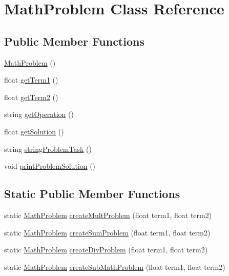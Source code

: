\hypertarget{classMathProblem}{}\section{Math\+Problem Class Reference}
\label{classMathProblem}
\subsection*{Public Member Functions}
\begin{DoxyCompactItemize}
\item 
\hyperlink{classMathProblem_ad2df5ab798f1d5565f92db064a4683c1}{Math\+Problem} ()
\item 
float \hyperlink{classMathProblem_a4b39e98b486c8ce8322344d1189037f6}{get\+Term1} ()
\item 
float \hyperlink{classMathProblem_a5ef6bc92617fc30f7e19202c68d368e6}{get\+Term2} ()
\item 
string \hyperlink{classMathProblem_aaee9edad612c513d35416f75808facc4}{get\+Operation} ()
\item 
float \hyperlink{classMathProblem_a52c59481043bb463a9d08e5e51814b94}{get\+Solution} ()
\item 
string \hyperlink{classMathProblem_a6d9253af58a404a4fc6ada40203059d1}{string\+Problem\+Task} ()
\item 
void \hyperlink{classMathProblem_a177a64e01b81e75a4d790f10693437a9}{print\+Problem\+Solution} ()
\end{DoxyCompactItemize}
\subsection*{Static Public Member Functions}
\begin{DoxyCompactItemize}
\item 
static \hyperlink{classMathProblem}{Math\+Problem} \hyperlink{classMathProblem_a63bcf12dc631ce2b79be84d49a395d6a}{create\+Mult\+Problem} (float term1, float term2)
\item 
static \hyperlink{classMathProblem}{Math\+Problem} \hyperlink{classMathProblem_aa7d3d5ebabc462ff772bcf9a39bac92f}{create\+Sum\+Problem} (float term1, float term2)
\item 
static \hyperlink{classMathProblem}{Math\+Problem} \hyperlink{classMathProblem_a44cd76c9f75e5c87e2a808d3b7a39793}{create\+Div\+Problem} (float term1, float term2)
\item 
static \hyperlink{classMathProblem}{Math\+Problem} \hyperlink{classMathProblem_a6af8bad86aefc7d88a39720b809ab548}{create\+Sub\+Math\+Problem} (float term1, float term2)
\end{DoxyCompactItemize}
